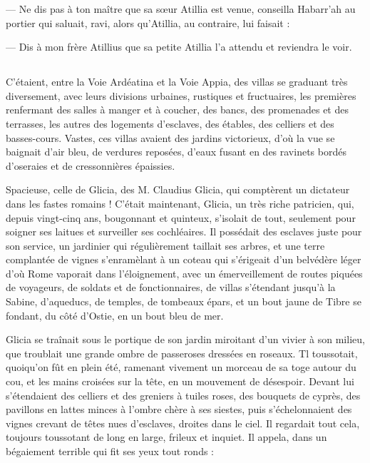 \documentclass[a4paper, 11pt, oneside, polutonikogreek, french]{article}
\begin{document}
--- Ne dis pas à ton maître que sa sœur Atillia est venue, conseilla Habarr'ah au portier qui saluait, ravi, alors qu’Atillia, au contraire, lui faisait :

--- Dis à mon frère Atillius que sa petite Atillia l'a attendu et reviendra le voir.
\clearpage
\subsection{}
\paragraph{}
C'étaient, entre la Voie Ardéatina et la Voie Appia, des villas se graduant très diversement, avec leurs divisions urbaines, rustiques et fructuaires, les premières renfermant des salles à manger et à coucher, des bancs, des promenades et des terrasses, les autres des logements d'esclaves, des étables, des celliers et des basses-cours. Vastes, ces villas avaient des jardins victorieux, d'où la vue se baignait d'air bleu, de verdures reposées, d'eaux fusant en des ravinets bordés d'oseraies et de cressonnières épaissies.

Spacieuse, celle de Glicia, des M. Claudius Glicia, qui comptèrent un dictateur dans les fastes romains ! C'était maintenant, Glicia, un très riche patricien, qui, depuis vingt-cinq ans, bougonnant et quinteux, s'isolait de tout, seulement pour soigner ses laitues et surveiller ses cochléaires. Il possédait des esclaves juste pour son service, un jardinier qui régulièrement taillait ses arbres, et une terre complantée de vignes s'enramèlant à un coteau qui s'érigeait d'un belvédère léger d'où Rome vaporait dans l'éloignement, avec un émerveillement de routes piquées de voyageurs, de soldats et de fonctionnaires, de villas s'étendant jusqu'à la Sabine, d'aqueducs, de temples, de tombeaux épars, et un bout jaune de Tibre se fondant, du côté d'Ostie, en un bout bleu de mer.

Glicia se traînait sous le portique de son jardin miroitant d'un vivier à son milieu, que troublait une grande ombre de passeroses dressées en roseaux. Tl toussotait, quoiqu'on fût en plein été, ramenant vivement un morceau de sa toge autour du cou, et les mains croisées sur la tête, en un mouvement de désespoir. Devant lui s'étendaient des celliers et des greniers à tuiles roses, des bouquets de cyprès, des pavillons en lattes minces à l'ombre chère à ses siestes, puis s'échelonnaient des vignes crevant de têtes nues d'esclaves, droites dans le ciel. Il regardait tout cela, toujours toussotant de long en large, frileux et inquiet. Il appela, dans un bégaiement terrible qui fit ses yeux tout ronds :
\end{document}
